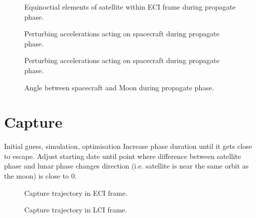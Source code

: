\begin{figure}
\centering
\def\svgwidth{\figurewidth}

\caption{Equinoctial elements of satellite within ECI frame during propagate phase.}
\label{fig:Propagate-mee}
\end{figure}


\begin{figure}
\centering
\def\svgwidth{\figurewidth}

\caption{Perturbing accelerations acting on spacecraft during propagate phase.}
\label{fig:Propagate-pert}
\end{figure}

\begin{figure}
\centering
\def\svgwidth{\figurewidth}

\caption{Perturbing accelerations acting on spacecraft during propagate phase.}
\label{fig:Propagate-pert2}
\end{figure}

\begin{figure}
\centering
\def\svgwidth{\figurewidth}

\caption{Angle between spacecraft and Moon during propagate phase.}
\label{fig:Propagate-phase}
\end{figure}


\clearpage

\section{Capture}
Initial guess, simulation, optimisation
Increase phase duration until it gets close to escape.
Adjust starting date until point where difference between satellite phase and lunar phase changes direction (i.e. satellite is near the same orbit as the moon) is close to 0\degrees.

\begin{figure}
\centering
\def\svgwidth{\figurewidth}

\caption{Capture trajectory in ECI frame.}
\label{fig:Capture-3D}
\end{figure}

\begin{figure}
\centering
\def\svgwidth{\figurewidth}

\caption{Capture trajectory in LCI frame.}
\label{fig:Capture-3D-eci}
\end{figure}

